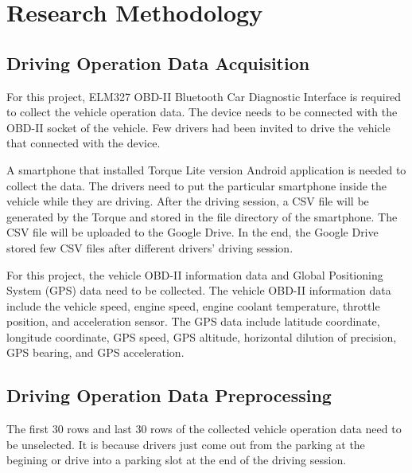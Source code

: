 \chapter{Research Methodology}

\section{Driving Operation Data Acquisition}
For this project, ELM327 OBD-II Bluetooth Car Diagnostic Interface is required to collect the vehicle operation data. The device needs to be connected with the OBD-II socket of the vehicle. Few drivers had been invited to drive the vehicle that connected with the device. 

A smartphone that installed Torque Lite version Android application is needed to collect the data. The drivers need to put the particular smartphone inside the vehicle while they are driving. After the driving session, a CSV file will be generated by the Torque and stored in the file directory of the smartphone. The CSV file will be uploaded to the Google Drive. In the end, the Google Drive stored few CSV files after different drivers' driving session.

For this project, the vehicle OBD-II information data and Global Positioning System (GPS) data need to be collected. The vehicle OBD-II information data include the vehicle speed, engine speed, engine coolant temperature, throttle position, and acceleration sensor. The GPS data include latitude coordinate, longitude coordinate, GPS speed, GPS altitude, horizontal dilution of precision, GPS bearing, and GPS acceleration.

\section{Driving Operation Data Preprocessing}
The first 30 rows and last 30 rows of the collected vehicle operation data need to be unselected. It is because drivers just come out from the parking at the begining or drive into a parking slot at the end of the driving session. 

